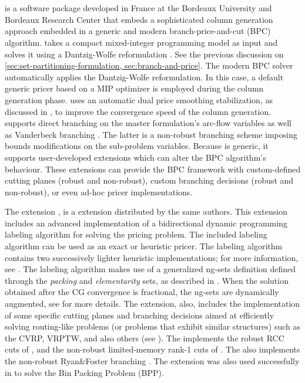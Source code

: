 \section{\bapcod{}}
\label{sec:results-bapcod}

\bapcod{} \parencite{sadykov2021} is a software package
developed in France at the Bordeaux University and Bordeaux Research Center
that embeds a sophisticated column generation approach
embedded in a generic and modern branch-price-and-cut (BPC) algorithm.
\bapcod{} takes a compact mixed-integer programming model as input
and solves it using a Dantzig-Wolfe reformulation \parencite{dantzig1960}.
See the previous discussion on \cref{sec:set-partitioning-formulation, sec:branch-and-price}.
The modern BPC solver automatically applies the Dantzig-Wolfe reformulation.
In this case, a default generic pricer based on a MIP optimizer
is employed during the column generation phase.
\bapcod{} uses an automatic dual price smoothing stabilization,
as discussed in \textcite{pessoa2018automation},
to improve the convergence speed of the column generation.
\bapcod{} supports direct branching on the master formulation's arc-flow variables
as well as Vanderbeck branching \parencite{vanderbeck2011}.
The latter is a non-robust branching scheme imposing bounds modifications on the sub-problem variables.
Because \bapcod{} is generic, it supports user-developed extensions
which can alter the BPC algorithm's behaviour.
These extensions can provide the BPC framework with
custom-defined cutting planes (robust and non-robust),
custom branching decisions (robust and non-robust),
or even ad-hoc pricer implementations.

The \vrpsolver{} extension \parencite{pessoa2020generic}, is
a \bapcod{} extension distributed by the same authors.
This extension includes an
advanced implementation of a bidirectional dynamic programming labeling algorithm
\parencite{sadykov2021bucket} for solving the pricing problem.
The included labeling algorithm
can be used as an exact or heuristic pricer.
The labeling algorithm contains two successively lighter heuristic implementations;
for more information, see \textcite{sadykov2021bucket}.
The labeling algorithm makes use of a generalized ng-sets definition \parencite{baldacci2011}
defined through the \textit{packing} and \textit{elementarity} sets,
as described in \textcite{pessoa2020generic}.
When the solution obtained after the CG convergence is fractional,
the ng-sets are dynamically augmented,
see \textcite{pessoa2020generic} for more details.
The \vrpsolver{} extension, also,
includes the implementation of some
specific cutting planes and branching decisions
aimed at efficiently solving routing-like problems
(or problems that exhibit similar structures)
such as the CVRP, VRPTW, and also others (see \cite{pessoa2020generic}).
The \vrpsolver{} implements the robust RCC cuts of \textcite{laporte1983},
and the non-robust limited-memory rank-1 cuts of \textcite{pecin2017improved}.
The \vrpsolver{} also implements the non-robust Ryan\&Foster branching \parencite{ryan1981integer}.
The \vrpsolver{} extension was also used successfully in \textcite{pessoa2020}
to solve the Bin Packing Problem (BPP).

